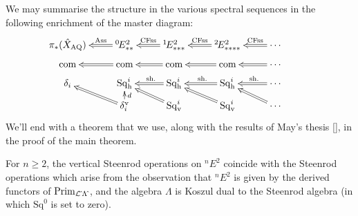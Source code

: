 \documentclass[11pt]{article}
\newcommand{\Sq}{\mathrm{Sq}}
\begin{document}
We may summarise the structure in the various spectral sequences in the following enrichment of the master diagram:
\[\xymatrix@R=2mm{
\pi_{*}(\hat X_\textup{AQ})&%
\ar@{=>}[l]_-{\textup{Ass}}
{^{0\!}}E^2_{**}&%
\ar@{=>}[l]_-{\textup{CFss}}
{^{1\!}}E^2_{***}
&%
{^{2\!}}E^2_{****}
\ar@{=>}[l]_-{\textup{CFss}}&%
\cdots
\ar@{=>}[l]_-{\textup{CFss}}%
\\
\textup{com}&
\textup{com}\ar@{=>}[l]&
\textup{com}\ar@{=>}[l]&
\textup{com}\ar@{=>}[l]&
\cdots \ar@{=>}[l]\\
\delta_i&
\Sq^i_\textup{h}&
\Sq^i_\textup{h}\ar@{=>}[l]_-{\ \textup{sh.}}&
\Sq^i_\textup{h}\ar@{=>}[l]_-{\ \textup{sh.}}&
\cdots \ar@{=>}[l]_-{\ \textup{sh.}}\\
&
\delta^\textup{v}_i\ar@{=>}[ul]\ar[u]_-d
&
\Sq_\textup{v}^i\ar@{=>}[ul]&
\Sq_\textup{v}^i\ar@{=>}[ul]&
\cdots \ar@{=>}[ul]&
}\]
We'll end with a theorem that we use, along with the results of May's thesis [], in the proof of the main theorem.
\begin{thm*}
For $n\geq2$, the vertical Steenrod operations on ${^{n\!}}E^2$ coincide with the Steenrod operations which arise from the observation that ${^{n\!}}E^2$ is given by the derived functors of $\textup{Prim}_{\mathcal{L}{\hat{\,}}\Lambda{\hat{\,}}}$, and the algebra $\Lambda$ is Koszul dual to the Steenrod algebra (in which $\Sq^0$ is set to zero).
\end{thm*}

\printbibliography
\end{document}

